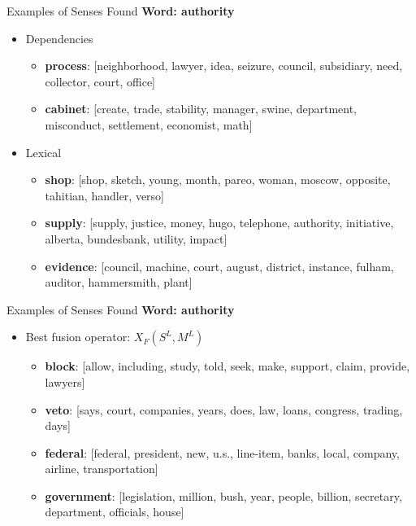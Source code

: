 \documentclass[10pt,=table]{beamer}
\newcommand\mlex{M^{\scriptscriptstyle L}}
\newcommand\slex{S^{\scriptscriptstyle L}}
\begin{document}
\begin{frame}{Examples of Senses Found }
\textbf{Word: authority}
\begin{itemize}
\item Dependencies
\begin{itemize}
	\item \textbf{process}: [neighborhood, lawyer, idea, seizure, council, subsidiary, need, collector, court, office]
	\item \textbf{cabinet}: [create, trade, stability, manager, swine, department, misconduct, settlement, economist, math] 
		
\end{itemize}
\item Lexical
\begin{itemize}
	\item \textbf{shop}: [shop, sketch, young, month, pareo, woman, moscow, opposite, tahitian, handler, verso]
	\item \textbf{supply}: [supply, justice, money, hugo, telephone, authority, initiative, alberta, bundesbank, utility, impact] 
	\item \textbf{evidence}: [council, machine, court, august, district, instance, fulham, auditor, hammersmith, plant]
		
\end{itemize}
\end{itemize}
\end{frame}

\begin{frame}{Examples of Senses Found}
\textbf{Word: authority}
\begin{itemize}
\item Best fusion operator: $X_F(\slex,\mlex)$
\begin{itemize}
	\item \textbf{block}: [allow, including, study, told,
	       seek, make, support, claim, provide, lawyers]
	\item \textbf{veto}: [says, court, companies, years, does, law,
	       loans, congress, trading, days]
	\item \textbf{federal}: [federal, president, new, u.s., line-item, banks, local, company, airline, transportation]
	\item \textbf{government}: [legislation, million,
	       bush, year, people, billion, secretary, department, officials, house]
		
\end{itemize}
\end{itemize}


\end{frame}
\end{document}
